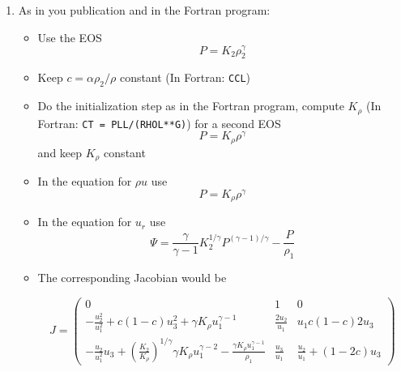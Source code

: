 \documentclass{article}
\begin{document}
\begin{enumerate}
\item As in you publication and in the Fortran program:
  \begin{itemize}
  \item Use the EOS
    \begin{equation}
      P = K_2 \rho_2^\gamma 
    \end{equation}
  \item Keep $c=\alpha \rho_2/\rho$ constant (In Fortran: \verb+CCL+)
  \item Do the initialization step as in the Fortran program, compute
    $K_\rho$ (In Fortran: \verb+CT = PLL/(RHOL**G)+) for a second EOS
    \begin{equation}
      P =  K_\rho \rho^{\gamma}
    \end{equation}
    and keep $K_\rho$ constant
  \item In the equation for $\rho u$ use
    \[
    P =  K_\rho \rho^{\gamma}
    \]
  \item In the equation for $u_r$ use
    \[
    \Psi = \frac{\gamma}{\gamma-1} K_2^{1/\gamma}
    P^{(\gamma-1)/\gamma} - \frac{P}{\rho_1}
    \]
  \item The corresponding Jacobian would be

    \begin{equation}
      J = \left(\begin{array}{ccc}
        0 & 1 & 0\\[3mm]
        - \frac{u_2^2}{u_1^2} + c (1-c) u_3^2  + \gamma K_\rho u_1^{\gamma-1}
        & \frac{2 u_2}{u_1}  &  u_1 c (1-c) 2 u_3  \\[3mm]
        - \frac{u_2}{u_1^2} u_3 +
        \left(\frac{K_2}{K_\rho}\right)^{1/\gamma}
        \gamma K_\rho u_1^{\gamma-2} - \frac{\gamma K_\rho u_1^{\gamma-1}}{\rho_1} 
        &   \frac{u_3}{u_1}  &  
        \frac{u_2}{u_1} + (1-2c) u_3 
      \end{array}\right)\label{eq:jacobi_v1}
    \end{equation}   
    
  \end{itemize}
  

\end{enumerate}
\end{document}
